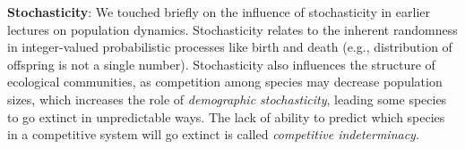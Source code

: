 \documentclass[12pt]{article}
\begin{document}
\textbf{Stochasticity}: We touched briefly on the influence of stochasticity in earlier lectures on population dynamics. Stochasticity relates to the inherent randomness in integer-valued probabilistic processes like birth and death (e.g., distribution of offspring is not a single number). Stochasticity also influences the structure of ecological communities, as competition among species may decrease population sizes, which increases the role of \textit{demographic stochasticity}, leading some species to go extinct in unpredictable ways. The lack of ability to predict which species in a competitive system will go extinct is called \textit{competitive indeterminacy}. \\ 
\end{document}
